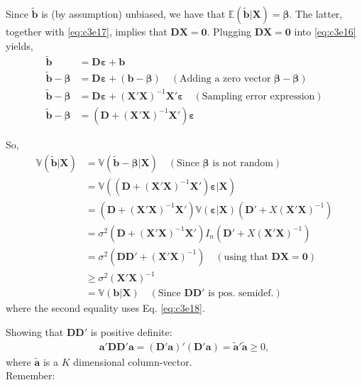 \documentclass[
]{book}
\begin{document}
Since \(\tilde{\mathbf{b}}\) is (by assumption) unbiased, we have that
\(\mathbb{E}(\tilde{\mathbf{b}}|\mathbf{X})=\boldsymbol{\beta}\). The latter, together with \eqref{eq:c3e17}, implies that \(\mathbf{D}\mathbf{X}=\mathbf{0}\). Plugging \(\mathbf{D}\mathbf{X}=\mathbf{0}\) into \eqref{eq:c3e16} yields,
\begin{align}
\tilde{\mathbf{b}}&=\mathbf{D}\boldsymbol{\varepsilon} + \mathbf{b}\nonumber\\
\tilde{\mathbf{b}}-\boldsymbol{\beta}&=\mathbf{D}\boldsymbol{\varepsilon} + (\mathbf{b}-\boldsymbol{\beta})\quad(\text{Adding a zero vector $\boldsymbol{\beta}-\boldsymbol{\beta}$})\nonumber\\
\tilde{\mathbf{b}}-\boldsymbol{\beta}&=\mathbf{D}\boldsymbol{\varepsilon} + \left(\mathbf{X}'\mathbf{X}\right)^{-1}\mathbf{X}'\boldsymbol{\varepsilon}\quad(\text{Sampling error expression})\nonumber\\
\tilde{\mathbf{b}}-\boldsymbol{\beta}&=\left(\mathbf{D} + \left(\mathbf{X}'\mathbf{X}\right)^{-1}\mathbf{X}'\right)\boldsymbol{\varepsilon}
\label{eq:c3e18}
\end{align}

So,
\begin{align*}
  \mathbb{V}(\tilde{\mathbf{b}}|\mathbf{X})
  &= \mathbb{V}(\tilde{\mathbf{b}}-\boldsymbol{\beta}|\mathbf{X})\quad\left(\text{Since } \boldsymbol{\beta} \text{ is not random}\right)\\
  &= \mathbb{V}((\mathbf{D} + (\mathbf{X}'\mathbf{X})^{-1}\mathbf{X}')\boldsymbol{\varepsilon}|\mathbf{X})\\
  &= (\mathbf{D} + (\mathbf{X}'\mathbf{X})^{-1}\mathbf{X}')\mathbb{V}(\boldsymbol{\varepsilon}|\mathbf{X})(\mathbf{D}' + X(\mathbf{X}'\mathbf{X})^{-1})\\
  &= \sigma^2(\mathbf{D} + (\mathbf{X}'\mathbf{X})^{-1}\mathbf{X}')I_n(\mathbf{D}' + X(\mathbf{X}'\mathbf{X})^{-1})\\
  &= \sigma^2\left(\mathbf{D}\mathbf{D}'+(\mathbf{X}'\mathbf{X})^{-1}\right)\quad(\text{using that } \mathbf{D}\mathbf{X}=\mathbf{0}) \\
  &\geq\sigma^2(\mathbf{X}'\mathbf{X})^{-1} \\
  &= \mathbb{V}(\mathbf{b}|\mathbf{X}) \quad(\text{Since }\mathbf{D}\mathbf{D}' \text{ is pos.~semidef.})
\end{align*}
where the second equality uses Eq. \eqref{eq:c3e18}.

Showing that \(\mathbf{D}\mathbf{D}'\) is positive definite:
\begin{align}
  \mathbf{a}'\mathbf{D}\mathbf{D}'\mathbf{a}=(\mathbf{D}'\mathbf{a})'(\mathbf{D}'\mathbf{a})=\tilde{\mathbf{a}}'\tilde{\mathbf{a}}\geq 0,
\end{align}
where \(\tilde{\mathbf{a}}\) is a \(K\) dimensional column-vector.\\
Remember:
\end{document}
